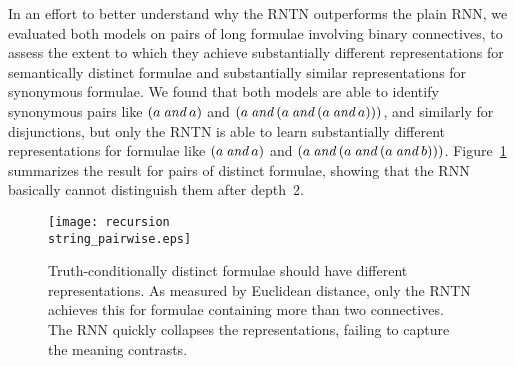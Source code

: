In an effort to better understand why the RNTN outperforms the plain
RNN, we evaluated both models on pairs of long formulae involving
binary connectives, to assess the extent to which they achieve
substantially different representations for semantically distinct
formulae and substantially similar representations for synonymous
formulae. We found that both models are able to identify synonymous
pairs like $(a \mathbin{\textit{and}} a)$ and $(a \mathbin{\textit{and}} (a \mathbin{\textit{and}} (a \mathbin{\textit{and}} a)))$,
and similarly for disjunctions, but only the RNTN is able to learn
substantially different representations for formulae like $(a \mathbin{\textit{and}}
a)$ and $(a \mathbin{\textit{and}} (a \mathbin{\textit{and}} (a \mathbin{\textit{and}}
b)))$. Figure~\ref{prop-falloff} summarizes the result for pairs of
distinct formulae, showing that the RNN basically cannot distinguish
them after depth~2.



\begin{figure}[htp]
  \centering
  \texttt{[image: recursion\\string\_pairwise.eps]}
  \caption{Truth-conditionally distinct formulae should have different
    representations. As measured by Euclidean distance, only the RNTN
    achieves this for formulae containing more than two
    connectives. The RNN quickly collapses the representations,
    failing to capture the meaning contrasts.}
  \label{prop-falloff}
\end{figure}



